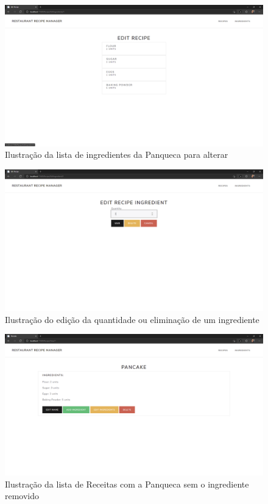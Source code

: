 \FloatBarrier
\begin{figure}[!hbt]
    \centering
    \includegraphics[width=14cm]{Resources/WebApp/Recipes/recipe (7).png}
    \caption{Ilustração da lista de ingredientes da Panqueca para alterar}
    
\end{figure}
\FloatBarrier
\begin{figure}[!hbt]
    \centering
    \includegraphics[width=14cm]{Resources/WebApp/Recipes/recipe (8).png}
    \caption{Ilustração do edição da quantidade ou eliminação de um ingrediente}
    
\end{figure}
\FloatBarrier
\begin{figure}[!hbt]
    \centering
    \includegraphics[width=14cm]{Resources/WebApp/Recipes/recipe (9).png}
    \caption{Ilustração da lista de Receitas com a Panqueca sem o ingrediente removido}
    
\end{figure}

